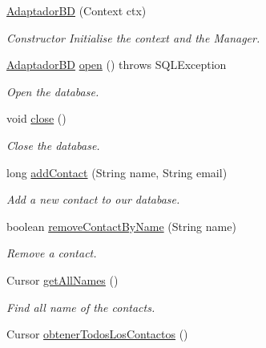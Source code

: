 \begin{DoxyCompactItemize}
\item 
\hyperlink{classnpi_1_1practicaandroid_1_1tutorialnpi_1_1_adaptador_b_d_ae2c480d1905c47980f292da8ccbce7fc}{Adaptador\-B\-D} (Context ctx)
\begin{DoxyCompactList}\small\item\em Constructor Initialise the context and the Manager. \end{DoxyCompactList}\item 
\hyperlink{classnpi_1_1practicaandroid_1_1tutorialnpi_1_1_adaptador_b_d}{Adaptador\-B\-D} \hyperlink{classnpi_1_1practicaandroid_1_1tutorialnpi_1_1_adaptador_b_d_a128413ac90cfc708b95c21d946f9600d}{open} ()  throws S\-Q\-L\-Exception 
\begin{DoxyCompactList}\small\item\em Open the database. \end{DoxyCompactList}\item 
void \hyperlink{classnpi_1_1practicaandroid_1_1tutorialnpi_1_1_adaptador_b_d_a466dc4c61ae61457cf986b5d8c6f6f52}{close} ()
\begin{DoxyCompactList}\small\item\em Close the database. \end{DoxyCompactList}\item 
long \hyperlink{classnpi_1_1practicaandroid_1_1tutorialnpi_1_1_adaptador_b_d_ad439502dcc05da37509b1e693be223d9}{add\-Contact} (String name, String email)
\begin{DoxyCompactList}\small\item\em Add a new contact to our database. \end{DoxyCompactList}\item 
boolean \hyperlink{classnpi_1_1practicaandroid_1_1tutorialnpi_1_1_adaptador_b_d_a1fd702d46f017cca50e03a46eb0ff8dc}{remove\-Contact\-By\-Name} (String name)
\begin{DoxyCompactList}\small\item\em Remove a contact. \end{DoxyCompactList}\item 
Cursor \hyperlink{classnpi_1_1practicaandroid_1_1tutorialnpi_1_1_adaptador_b_d_ab57b493581975afbbf05b835c4fa4f21}{get\-All\-Names} ()
\begin{DoxyCompactList}\small\item\em Find all name of the contacts. \end{DoxyCompactList}\item 
Cursor \hyperlink{classnpi_1_1practicaandroid_1_1tutorialnpi_1_1_adaptador_b_d_adefdc5d28d774882336abfda419979f2}{obtener\-Todos\-Los\-Contactos} ()

\end{DoxyCompactItemize}
